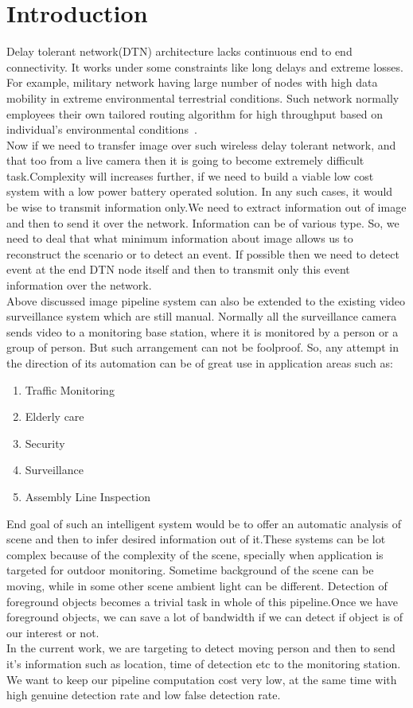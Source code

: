 
\chapter{Introduction} %
\label{Chapter1}

Delay tolerant network(DTN) architecture lacks continuous end to end
connectivity. It works under some constraints like long delays and
extreme losses. For example, military network having large number of
nodes with high data mobility in extreme environmental terrestrial
conditions. Such network normally employees their own tailored routing
algorithm for high throughput based on individual's environmental
conditions~\cite{1}.\\
Now if we need to transfer image over such wireless delay tolerant
network, and that too from a live camera then it is going to become
extremely difficult task.Complexity will increases further, if we need
to build a viable low cost system with a low power battery operated
solution.  In any such cases, it would be wise to transmit
information only.We need to extract information out of image and then to
send it over the network.  Information can be of various type. So, we
need to deal that what minimum information about image allows us to
reconstruct the scenario or to detect an event. If possible then we 
need to detect event at the end DTN node itself and then to transmit
only this event information over the network.\\
Above discussed image pipeline system can also be extended to
the existing video surveillance system which are still manual. Normally
all the surveillance camera sends video to a monitoring base station,
where it is monitored by a person or a group of person. But such
arrangement can not be foolproof. So, any attempt in the direction of
its automation can be of great use in application areas such as:
\begin{enumerate}
 \item  Traffic Monitoring
  \item Elderly care
  \item Security
  \item Surveillance
  \item Assembly Line Inspection
\end{enumerate}
End goal of such an intelligent system would be to offer an
automatic analysis of scene and then to infer desired information out of
it.These systems can be lot complex because of the complexity of the
scene, specially when application is targeted for outdoor monitoring.
Sometime background of the scene can be moving, while in some
other scene ambient light can be different. Detection of foreground
objects becomes a trivial task in whole of this pipeline.Once we have
foreground objects, we can save a lot of bandwidth if we can detect if
object is of our interest or not.\\
In the current work, we are targeting to detect moving person and
then to send it's information such as location, time of detection etc to
the monitoring station. We want to keep our pipeline computation cost
very low, at the same time with high genuine detection rate and low
false detection rate.



